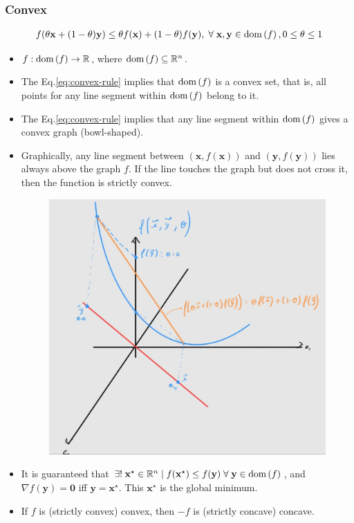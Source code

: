 \documentclass{article}
\newcommand{\dom}[1]{\ensuremath{\textnormal{dom}\left(#1\right)}} %
\begin{document}
\subsubsection{Convex}
\begin{align}
    f(\theta\mathbf{x}+(1-\theta)\mathbf{y}) \leq \theta f(\mathbf{x}) + (1-\theta)f(\mathbf{y}),\;\forall\; \mathbf{x}, \mathbf{y} \in \dom{f}, 0\leq\theta\leq 1
    \label{eq:convex-rule}
\end{align}
\begin{itemize}
    \item \(f: \dom{f} \rightarrow \mathbb{R}\), where \(\dom{f} \subseteq \mathbb{R}^{n}\).
    \item The Eq.\eqref{eq:convex-rule} implies that \(\dom{f}\) is a convex set, that is, all points for any line segment within \(\dom{f}\) belong to it.
    \item The Eq.\eqref{eq:convex-rule} implies that any line segment within \(\dom{f}\) gives a convex graph (bowl-shaped).
    \item Graphically, any line segment between \((\mathbf{x}, f(\mathbf{x}))\) and \((\mathbf{y}, f(\mathbf{y}))\) lies always above the graph \(f\). If the line touches the graph but does not cross it, then the function is strictly convex.
    \begin{figure}[H]
        \centering
        \includegraphics[scale=.2]{figs/convex.png}
    \end{figure}
    \item It is guaranteed that \(\exists!\; \mathbf{x}^{\star} \in \mathbb{R}^{n} \mid f(\mathbf{x}^{\star}) \leq f(\mathbf{y})\;\forall\;\mathbf{y}\in\dom{f}\), and \(\nabla f(\mathbf{y}) = \mathbf{0}\) iff \(\mathbf{y} = \mathbf{x}^{\star}\). This \(\mathbf{x}^{\star}\) is the global minimum.
    \item If \(f\) is (strictly convex) convex, then \(-f\) is (strictly concave) concave.
\end{itemize}
\end{document}

